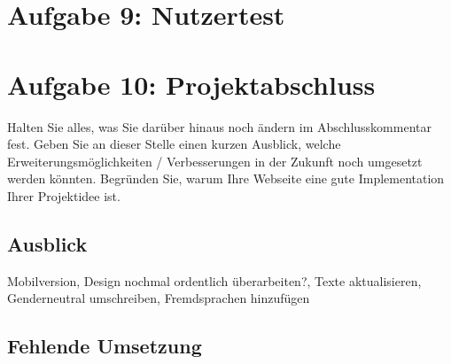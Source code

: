 \documentclass{scrartcl}
\begin{document}
\section*{Aufgabe 9: Nutzertest}
\section*{Aufgabe 10: Projektabschluss}
 Halten Sie alles, was Sie darüber hinaus noch ändern im Abschlusskommentar fest. Geben Sie
an dieser Stelle einen kurzen Ausblick, welche Erweiterungsmöglichkeiten / Verbesserungen in
der Zukunft noch umgesetzt werden könnten. Begründen Sie, warum Ihre Webseite eine gute
Implementation Ihrer Projektidee ist.
 \subsection*{Ausblick} 
 Mobilversion, Design nochmal ordentlich überarbeiten?, Texte aktualisieren, Genderneutral umschreiben, Fremdsprachen hinzufügen
 \subsection*{Fehlende Umsetzung}
\end{document}
